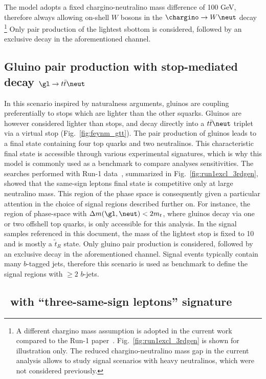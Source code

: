 The model adopts a fixed chargino-neutralino mass difference of 100 GeV, 
therefore always allowing on-shell $W$ bosons in the $\chargino\to W\neut$ decay
\footnote{A different chargino mass assumption is adopted in the current 
work compared to the Run-1 paper~\cite{DraftSquarkGluinoSummaryPaper}.
Fig.~\ref{fig:run1excl_3rdgen} is shown for illustration only.
The reduced chargino-neutralino mass gap in the current analysis 
allows to study signal scenarios with heavy neutralinos, which were not considered previously.}
Only pair production of the lightest sbottom is considered, followed by an exclusive decay in the aforementioned channel. 


\subsection{Gluino pair production with stop-mediated decay $\gl\to t\bar t\neut$}
\label{subsec:signals_gtt}

In this scenario inspired by naturalness arguments, gluinos are coupling preferentially to stops which are lighter than the other squarks. 
Gluinos are however considered lighter than stops, and decay directly into a $t\bar t\neut$ triplet via a virtual stop (Fig.~\ref{fig:feynm_gtt}). 
The pair production of gluinos leads to a final state containing four top quarks and two neutralinos. 
This characteristic final state is accessible through various experimental signatures, which is why this model 
is commonly used as a benchmark to compare analyses sensitivities. 
The searches performed with Run-1 data~\cite{DraftSquarkGluinoSummaryPaper}, 
summarized in Fig.~\ref{fig:run1excl_3rdgen}, showed that the same-sign leptons final state is competitive only at large neutralino mass. 
This region of the phase space is consequently given a particular attention in the choice of signal regions described further on. 
For instance, the region of phase-space with $\Delta m(\gl,\neut)<2m_t$, where gluinos decay via one or two offshell top quarks, is only accessible for this 
analysis.
In the signal samples referenced in this document, the mass of the lightest stop is fixed to 10 \TeV and is mostly a $\widetilde{t}_R$ state. 
Only gluino pair production is considered, followed by an exclusive decay in the aforementioned channel. 
Signal events typically contain many $b$-tagged jets, 
therefore this scenario is used as benchmark to define the signal regions with $\ge 2$ $b$-jets. 

\subsection{\stst\ with ``three-same-sign leptons'' signature}
\label{subsec:signals_3lss}

